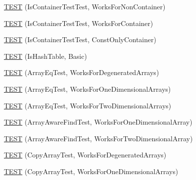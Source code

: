 \begin{DoxyCompactItemize}
\item 
\mbox{\hyperlink{_obj__test_2lib_2googletest-master_2googletest_2test_2gtest__unittest_8cc_a819ddb03c072631f5606a9ddf4be5ef9}{T\+E\+ST}} (Is\+Container\+Test\+Test, Works\+For\+Non\+Container)
\item 
\mbox{\hyperlink{_obj__test_2lib_2googletest-master_2googletest_2test_2gtest__unittest_8cc_a28c741995150722b00c039ead2b8ab04}{T\+E\+ST}} (Is\+Container\+Test\+Test, Works\+For\+Container)
\item 
\mbox{\hyperlink{_obj__test_2lib_2googletest-master_2googletest_2test_2gtest__unittest_8cc_a54cda93a5356bccbf0467950b644ff02}{T\+E\+ST}} (Is\+Container\+Test\+Test, Const\+Only\+Container)
\item 
\mbox{\hyperlink{_obj__test_2lib_2googletest-master_2googletest_2test_2gtest__unittest_8cc_ab060da75dc9cd1d8ece17e4c1ed3c037}{T\+E\+ST}} (Is\+Hash\+Table, Basic)
\item 
\mbox{\hyperlink{_obj__test_2lib_2googletest-master_2googletest_2test_2gtest__unittest_8cc_ae9e7a844847a2df933aa4c2f85f7ceed}{T\+E\+ST}} (Array\+Eq\+Test, Works\+For\+Degenerated\+Arrays)
\item 
\mbox{\hyperlink{_obj__test_2lib_2googletest-master_2googletest_2test_2gtest__unittest_8cc_a4ea595c1e4b3620fb8cf7366dd533c95}{T\+E\+ST}} (Array\+Eq\+Test, Works\+For\+One\+Dimensional\+Arrays)
\item 
\mbox{\hyperlink{_obj__test_2lib_2googletest-master_2googletest_2test_2gtest__unittest_8cc_ab18237f1a37018db8b5a78ae84b209ec}{T\+E\+ST}} (Array\+Eq\+Test, Works\+For\+Two\+Dimensional\+Arrays)
\item 
\mbox{\hyperlink{_obj__test_2lib_2googletest-master_2googletest_2test_2gtest__unittest_8cc_a563807f4b8c6d7fbf2945f279e38468e}{T\+E\+ST}} (Array\+Aware\+Find\+Test, Works\+For\+One\+Dimensional\+Array)
\item 
\mbox{\hyperlink{_obj__test_2lib_2googletest-master_2googletest_2test_2gtest__unittest_8cc_a1ca0fb8b6355671bbe5a62300585db5a}{T\+E\+ST}} (Array\+Aware\+Find\+Test, Works\+For\+Two\+Dimensional\+Array)
\item 
\mbox{\hyperlink{_obj__test_2lib_2googletest-master_2googletest_2test_2gtest__unittest_8cc_ad6d3761861147173657e547cb118877f}{T\+E\+ST}} (Copy\+Array\+Test, Works\+For\+Degenerated\+Arrays)
\item 
\mbox{\hyperlink{_obj__test_2lib_2googletest-master_2googletest_2test_2gtest__unittest_8cc_a0155f940cddc15a77da7df03325c6d1d}{T\+E\+ST}} (Copy\+Array\+Test, Works\+For\+One\+Dimensional\+Arrays)

\end{DoxyCompactItemize}
